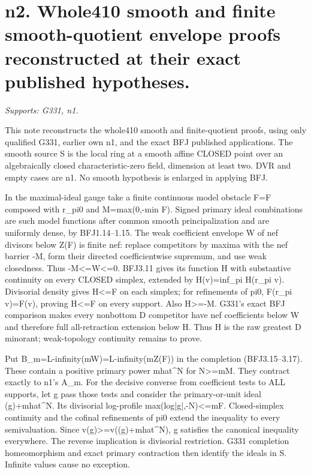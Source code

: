 \section{n2. Whole410 smooth and finite smooth-quotient envelope proofs reconstructed at their exact published hypotheses.}
\textit{Supports: G331, n1.}

This note reconstructs the whole410 smooth and finite-quotient proofs, using only qualified G331, earlier own n1, and the exact BFJ published applications. The smooth source S is the local ring at a smooth affine CLOSED point over an algebraically closed characteristic-zero field, dimension at least two. DVR and empty cases are n1. No smooth hypothesis is enlarged in applying BFJ.

In the maximal-ideal gauge take a finite continuous model obstacle F=F composed with r\_pi0 and M=max(0,-min F). Signed primary ideal combinations are such model functions after common smooth principalization and are uniformly dense, by BFJ1.14--1.15. The weak coefficient envelope W of nef divisors below Z(F) is finite nef: replace competitors by maxima with the nef barrier -M, form their directed coefficientwise supremum, and use weak closedness. Thus -M\textless{}=W\textless{}=0. BFJ3.11 gives its function H with substantive continuity on every CLOSED simplex, extended by H(v)=inf\_pi H(r\_pi v). Divisorial density gives H\textless{}=F on each simplex; for refinements of pi0, F(r\_pi v)=F(v), proving H\textless{}=F on every support. Also H\textgreater{}=-M. G331's exact BFJ comparison makes every nonbottom D competitor have nef coefficients below W and therefore full all-retraction extension below H. Thus H is the raw greatest D minorant; weak-topology continuity remains to prove.

Put B\_m=L-infinity(mW)=L-infinity(mZ(F)) in the completion (BFJ3.15--3.17). These contain a positive primary power mhat\textasciicircum{}N for N\textgreater{}=mM. They contract exactly to n1's A\_m. For the decisive converse from coefficient tests to ALL supports, let g pass those tests and consider the primary-or-unit ideal (g)+mhat\textasciicircum{}N. Its divisorial log-profile max(log|g|,-N)\textless{}=mF. Closed-simplex continuity and the cofinal refinements of pi0 extend the inequality to every semivaluation. Since v(g)\textgreater{}=v((g)+mhat\textasciicircum{}N), g satisfies the canonical inequality everywhere. The reverse implication is divisorial restriction. G331 completion homeomorphism and exact primary contraction then identify the ideals in S. Infinite values cause no exception.

